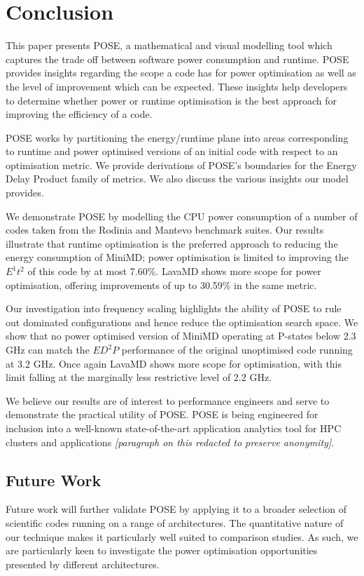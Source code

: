 \section{Conclusion}
\label{sec:conclusion}
\noindent
This paper presents POSE, a mathematical and visual modelling tool which captures the trade off between software power consumption and runtime.
POSE provides insights regarding the scope a code has for power optimisation as well as the level of improvement which can be expected.
These insights help developers to determine whether power or runtime optimisation is the best approach for improving the efficiency of a code.

POSE works by partitioning the energy/runtime plane into areas corresponding to runtime and power optimised versions of an initial code with respect to an optimisation metric.
We provide derivations of POSE's boundaries for the Energy Delay Product family of metrics.
We also discuss the various insights our model provides.

We demonstrate POSE by modelling the CPU power consumption of a number of codes taken from the Rodinia and Mantevo benchmark suites.  
Our results illustrate that runtime optimisation is the preferred approach to reducing the energy consumption of MiniMD; power optimisation is limited to improving the $E^1t^2$ of this code by at most 7.60\%.
LavaMD shows more scope for power optimisation, offering improvements of up to 30.59\% in the same metric. 

Our investigation into frequency scaling highlights the ability of POSE to rule out dominated configurations and hence reduce the optimisation search space.
We show that no power optimised version of MiniMD operating at P-states below 2.3 GHz can match the $ED^2P$ performance of the original unoptimised code running at 3.2 GHz.
Once again LavaMD shows more scope for optimisation, with this limit falling at the marginally less restrictive level of 2.2 GHz.

We believe our results are of interest to performance engineers and serve to demonstrate the practical utility of POSE.
POSE is being engineered for inclusion into a well-known state-of-the-art application analytics tool for HPC clusters and applications \textit{[paragraph on this redacted to preserve anonymity]}.

\subsection*{Future Work}
\noindent
Future work will further validate POSE by applying it to a broader selection of scientific codes running on a range of architectures.
The quantitative nature of our technique makes it particularly well suited to comparison studies.
As such, we are particularly keen to investigate the power optimisation opportunities presented by different architectures.

